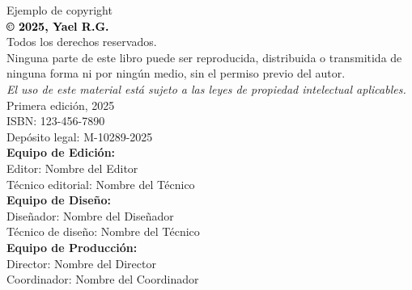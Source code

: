 \begin{center}
    \vspace*{2cm}
{\large Ejemplo de copyright} \\[0.8cm]
\textcolor{black}{\Large \textbf{© 2025, Yael R.G.}} \\[0.3cm]
{\large Todos los derechos reservados.} \\[0.8cm]
{\large Ninguna parte de este libro puede ser reproducida, distribuida o transmitida de ninguna forma ni por ningún medio, sin el permiso previo del autor.} \\[0.5cm]
{\small \textit{El uso de este material está sujeto a las leyes de propiedad intelectual aplicables.}} \\[0.5cm]

{\large Primera edición, 2025} \\[0.5cm]
{\large ISBN: 123-456-7890} \\[0.5cm]
{\large Depósito legal: M-10289-2025} \\[1.5cm]

{\large \textbf{Equipo de Edición:}} \\[0.5cm]
{\large Editor: Nombre del Editor} \\[0.5cm]
{\large Técnico editorial: Nombre del Técnico} \\[1.0cm]

{\large \textbf{Equipo de Diseño:}} \\[0.5cm]
{\large Diseñador: Nombre del Diseñador} \\[0.5cm]
{\large Técnico de diseño: Nombre del Técnico} \\[1.0cm]

{\large \textbf{Equipo de Producción:}} \\[0.5cm]
{\large Director: Nombre del Director} \\[0.5cm]
{\large Coordinador: Nombre del Coordinador} \\[5.0cm]


\end{center}
